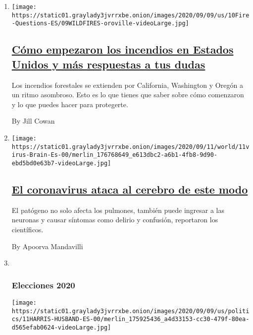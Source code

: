\begin{enumerate}
\def\labelenumi{\arabic{enumi}.}
\item
  \texttt{[image: https://static01.graylady3jvrrxbe.onion/images/2020/09/09/us/10Fire-Questions-ES/09WILDFIRES-oroville-videoLarge.jpg]}

  \hypertarget{cuxf3mo-empezaron-los-incendios-en-estados-unidos-y-muxe1s-respuestas-a-tus-dudas}{%
  \subsection{\texorpdfstring{\href{/es/2020/09/10/espanol/estados-unidos/incendios-california-oregon-washington.html}{Cómo
  empezaron los incendios en Estados Unidos y más respuestas a tus
  dudas}}{Cómo empezaron los incendios en Estados Unidos y más respuestas a tus dudas}}\label{cuxf3mo-empezaron-los-incendios-en-estados-unidos-y-muxe1s-respuestas-a-tus-dudas}}

  Los incendios forestales se extienden por California, Washington y
  Oregón a un ritmo asombroso. Esto es lo que tienes que saber sobre
  cómo comenzaron y lo que puedes hacer para protegerte.

  By Jill Cowan
\item
  \texttt{[image: https://static01.graylady3jvrrxbe.onion/images/2020/09/11/world/11virus-Brain-Es-00/merlin\_176768649\_e613dbc2-a6b1-4fb8-9d90-ebd5bd0e63b7-videoLarge.jpg]}

  \hypertarget{el-coronavirus-ataca-al-cerebro-de-este-modo}{%
  \subsection{\texorpdfstring{\href{/es/2020/09/11/espanol/ciencia-y-tecnologia/cerebro-coronavirus.html}{El
  coronavirus ataca al cerebro de este
  modo}}{El coronavirus ataca al cerebro de este modo}}\label{el-coronavirus-ataca-al-cerebro-de-este-modo}}

  El patógeno no solo afecta los pulmones, también puede ingresar a las
  neuronas y causar síntomas como delirio y confusión, reportaron los
  científicos.

  By Apoorva Mandavilli
\item ~
  \hypertarget{elecciones-2020}{%
  \subsubsection{Elecciones 2020}\label{elecciones-2020}}

  \texttt{[image: https://static01.graylady3jvrrxbe.onion/images/2020/09/09/us/politics/11HARRIS-HUSBAND-ES-00/merlin\_175925436\_a4d33153-cc30-479f-80ea-d565efab0624-videoLarge.jpg]}


\end{enumerate}

